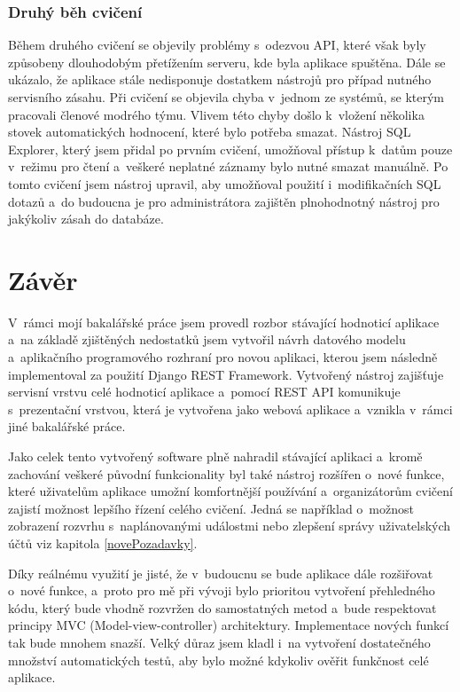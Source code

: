 \documentclass[
  digital,
  twoside,
  table, 
  nolof, 
  nolot
]{fithesis3}
\begin{document}
\subsection{Druhý běh cvičení}
Během druhého cvičení se objevily problémy s~odezvou API, které však byly způsobeny dlouhodobým přetížením serveru, kde byla aplikace spuštěna. Dále se ukázalo, že aplikace stále nedisponuje dostatkem nástrojů pro případ nutného servisního zásahu. Při cvičení se objevila chyba v~jednom ze systémů, se kterým pracovali členové modrého týmu. Vlivem této chyby došlo k~vložení několika stovek automatických hodnocení, které bylo potřeba smazat. Nástroj SQL Explorer, který jsem přidal po prvním cvičení, umožňoval přístup k~datům pouze v~režimu pro čtení a~veškeré neplatné záznamy bylo nutné smazat manuálně. Po tomto cvičení jsem nástroj upravil, aby umožňoval použití i~modifikačních SQL dotazů a~do budoucna je pro administrátora zajištěn plnohodnotný nástroj pro jakýkoliv zásah do databáze.

\chapter{Závěr}
\label{end}

V~rámci mojí bakalářské práce jsem provedl rozbor stávající hodnoticí aplikace a~na základě zjištěných nedostatků jsem vytvořil návrh datového modelu a~aplikačního programového rozhraní pro novou aplikaci, kterou jsem následně implementoval za použití Django REST Framework. Vytvořený nástroj zajišťuje servisní vrstvu celé hodnoticí aplikace a~pomocí REST API komunikuje s~prezentační vrstvou, která je vytvořena jako webová aplikace a~vznikla v~rámci jiné bakalářské práce. 

Jako celek tento vytvořený software plně nahradil stávající aplikaci a~kromě zachování veškeré původní funkcionality byl také nástroj rozšířen o~nové funkce, které uživatelům aplikace umožní komfortnější používání a~organizátorům cvičení zajistí možnost lepšího řízení celého cvičení. Jedná se například o~možnost zobrazení rozvrhu s~naplánovanými událostmi nebo zlepšení správy uživatelských účtů viz kapitola \ref{novePozadavky}.

Díky reálnému využití je jisté, že v~budoucnu se bude aplikace dále rozšiřovat o~nové funkce, a~proto pro mě při vývoji bylo prioritou vytvoření přehledného kódu, který bude vhodně rozvržen do samostatných metod a~bude respektovat principy MVC (Model-view-controller) architektury. Implementace nových funkcí tak bude mnohem snazší. Velký důraz jsem kladl i~na vytvoření dostatečného množství automatických testů, aby bylo možné kdykoliv ověřit funkčnost celé aplikace.
\end{document}
